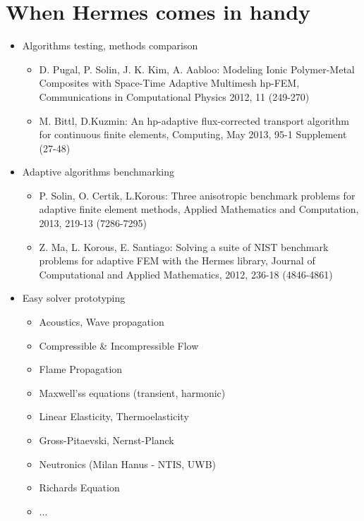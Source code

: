 \documentclass{beamer}
\begin{document}
\section{When Hermes comes in handy}
\begin{frame}
	\begin{itemize}
		\item \Large{Algorithms testing, methods comparison}
			\begin{itemize}
				\item \small
				D. Pugal, P. Solin, J. K. Kim, A. Aabloo: Modeling Ionic Polymer-Metal Composites with Space-Time Adaptive Multimesh hp-FEM, Communications in Computational Physics 2012, 11 (249-270) 
				\item \small
				M. Bittl, D.Kuzmin: An hp-adaptive flux-corrected transport algorithm for continuous finite elements, Computing, May 2013, 95-1 Supplement (27-48)
			\end{itemize}
		\item \Large{Adaptive algorithms benchmarking}
			\begin{itemize}
				\item \small
				P. Solin, O. Certik, L.Korous: Three anisotropic benchmark problems for adaptive finite element methods, Applied Mathematics and Computation, 2013, 219-13 (7286-7295)
				\item \small
				Z. Ma, L. Korous, E. Santiago: Solving a suite of NIST benchmark problems for adaptive FEM with the Hermes library, Journal of Computational and Applied Mathematics, 2012, 236-18 (4846-4861)
			\end{itemize}
		\item \Large{Easy solver prototyping}
		  \vspace{-3mm}
		  \begin{multicols}{2}
			\begin{itemize}
				\item \small Acoustics, Wave propagation
				\item \small  Compressible \& Incompressible Flow
				\item \small  Flame Propagation
				\item \small  Maxwell'ss equations (transient, harmonic)
				\item \small  Linear Elasticity, Thermoelasticity
				\item \small  Gross-Pitaevski, Nernst-Planck
				\item \small  Neutronics (Milan Hanus - NTIS, UWB)
				\item \small  Richards Equation
				\item \small  ...
			\end{itemize}
			\end{multicols}
	\end{itemize}
\end{frame}
\end{document}
